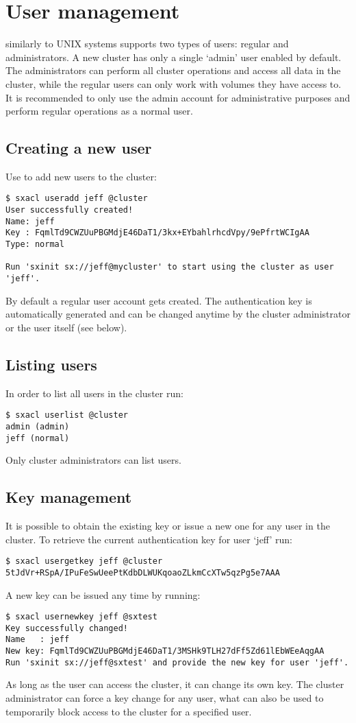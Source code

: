 \section{User management}
\SX similarly to UNIX systems supports two types of users: regular and
administrators. A new cluster has only a single `admin' user enabled by
default. The administrators can perform all cluster operations and access
all data in the cluster, while the regular users can only work with volumes
they have access to. It is recommended to only use the admin account for
administrative purposes and perform regular operations as a normal user.

\subsection{Creating a new user}
Use  to add new users to the cluster:
\begin{lstlisting}
$ sxacl useradd jeff @cluster
User successfully created!
Name: jeff
Key : FqmlTd9CWZUuPBGMdjE46DaT1/3kx+EYbahlrhcdVpy/9ePfrtWCIgAA
Type: normal

Run 'sxinit sx://jeff@mycluster' to start using the cluster as user 'jeff'.
\end{lstlisting}
By default a regular user account gets created. The authentication key is
automatically generated and can be changed anytime by the cluster
administrator or the user itself (see below).

\subsection{Listing users}
In order to list all users in the cluster run:
\begin{lstlisting}
$ sxacl userlist @cluster
admin (admin)
jeff (normal)
\end{lstlisting}
Only cluster administrators can list users.

\subsection{Key management}
It is possible to obtain the existing key or issue a new one for any
user in the cluster. To retrieve the current authentication key for
user `jeff' run:
\begin{lstlisting}
$ sxacl usergetkey jeff @cluster
5tJdVr+RSpA/IPuFeSwUeePtKdbDLWUKqoaoZLkmCcXTw5qzPg5e7AAA
\end{lstlisting}
A new key can be issued any time by running:
\begin{lstlisting}
$ sxacl usernewkey jeff @sxtest
Key successfully changed!
Name   : jeff
New key: FqmlTd9CWZUuPBGMdjE46DaT1/3MSHk9TLH27dFf5Zd61lEbWEeAqgAA
Run 'sxinit sx://jeff@sxtest' and provide the new key for user 'jeff'.
\end{lstlisting}
As long as the user can access the cluster, it can change its own
key. The cluster administrator can force a key change for any user,
what can also be used to temporarily block access to the cluster for
a specified user.

